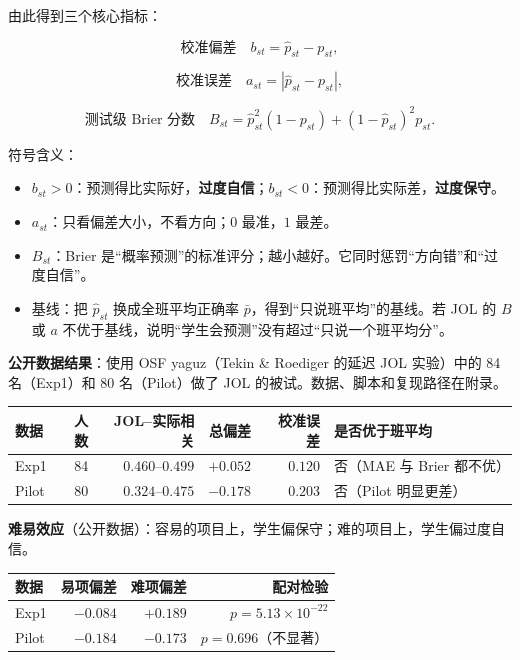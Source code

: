 \documentclass[UTF8,a4paper,11pt]{ctexart}
\begin{document}
由此得到三个核心指标：

\begin{equation}
\text{校准偏差}\quad b_{st}=\hat p_{st}-p_{st},
\end{equation}

\begin{equation}
\text{校准误差}\quad a_{st}=|\hat p_{st}-p_{st}|,
\end{equation}

\begin{equation}
\text{测试级 Brier 分数}\quad B_{st}=\hat p_{st}^{2}(1-p_{st})+(1-\hat p_{st})^{2}p_{st}.
\end{equation}

符号含义：

\begin{itemize}[leftmargin=2em]
\item $b_{st}>0$：预测得比实际好，\textbf{过度自信}；$b_{st}<0$：预测得比实际差，\textbf{过度保守}。
\item $a_{st}$：只看偏差大小，不看方向；$0$ 最准，$1$ 最差。
\item $B_{st}$：Brier 是“概率预测”的标准评分；越小越好。它同时惩罚“方向错”和“过度自信”。
\item 基线：把 $\hat p_{st}$ 换成全班平均正确率 $\bar p$，得到“只说班平均”的基线。若 JOL 的 $B$ 或 $a$ 不优于基线，说明“学生会预测”没有超过“只说一个班平均分”。
\end{itemize}

\textbf{公开数据结果}：使用 OSF yaguz（Tekin \& Roediger 的延迟 JOL 实验）中的 84 名（Exp1）和 80 名（Pilot）做了 JOL 的被试。数据、脚本和复现路径在附录。

\begin{center}
\begin{longtable}{@{}lrrrrl@{}}
\toprule
\textbf{数据} & \textbf{人数} & \textbf{JOL--实际相关} & \textbf{总偏差} & \textbf{校准误差} & \textbf{是否优于班平均} \\
\midrule
Exp1 & 84 & $0.460$--$0.499$ & $+0.052$ & $0.120$ & 否（MAE 与 Brier 都不优） \\
Pilot & 80 & $0.324$--$0.475$ & $-0.178$ & $0.203$ & 否（Pilot 明显更差） \\
\bottomrule
\end{longtable}
\end{center}

\textbf{难易效应}（公开数据）：容易的项目上，学生偏保守；难的项目上，学生偏过度自信。

\begin{center}
\begin{longtable}{@{}lrrr@{}}
\toprule
\textbf{数据} & \textbf{易项偏差} & \textbf{难项偏差} & \textbf{配对检验} \\
\midrule
Exp1 & $-0.084$ & $+0.189$ & $p=5.13\times10^{-22}$ \\
Pilot & $-0.184$ & $-0.173$ & $p=0.696$（不显著） \\
\bottomrule
\end{longtable}
\end{center}
\end{document}

